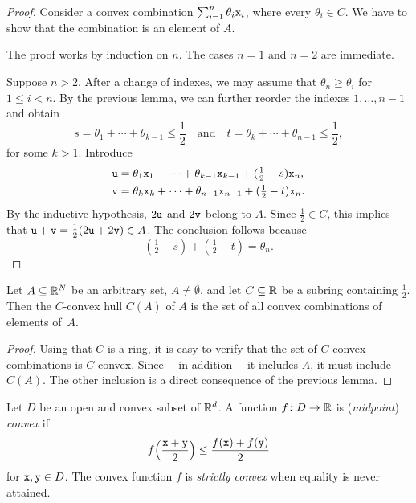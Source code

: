\begin{proof}
    Consider a convex combination $\sum_{i=1}^n\theta_i\mathtt x_i$, where every $\theta_i\in C$. We have to show that the combination is an element of $A$.

    The proof works by induction on $n$. The cases $n=1$ and $n=2$ are immediate.

    Suppose $n>2$. After a change of indexes, we may assume that $\theta_n\ge\theta_i$ for $1\le i<n$. By the previous lemma, we can further reorder the indexes $1,\dots,n-1$ and obtain
    \[
        s=\theta_1+\cdots+\theta_{k-1}\le\frac12
        \quad\text{and}\quad
        t=\theta_k+\cdots+\theta_{n-1}\le\frac12,
    \]
    for some $k>1$. Introduce
    \begin{align*}
        \mathtt u &= \theta_1\mathtt x_1+\cdots
            +\theta_{k-1}\mathtt x_{k-1}+(\tfrac12-s)\mathtt x_n,\\
        \mathtt v &= \theta_k\mathtt x_k+\cdots
            +\theta_{n-1}\mathtt x_{n-1}+(\tfrac12-t)\mathtt x_n.
    \end{align*}
    By the inductive hypothesis, $2\mathtt u$ and $2\mathtt v$ belong to $A$. Since $\frac12\in C$, this implies that $\mathtt u+\mathtt v=\frac12(2\mathtt u+2\mathtt v)\in A$. The conclusion follows because
    \[
        (\tfrac12-s)+(\tfrac12-t)=\theta_n.
    \]
\end{proof}

\begin{cor}
    Let\/ $A \subseteq \mathbb{R}^N$ be an arbitrary set, $A \ne \emptyset$, and let\/ $C \subseteq \mathbb{R}$ be a subring containing $\frac12$. Then the $C$-convex hull\/ $C(A)$ of\/ $A$ is the set of all convex combinations of elements of\/~$A$.
\end{cor}

\begin{proof}
    Using that $C$ is a ring, it is easy to verify that the set of $C$-convex combinations is $C$-convex. Since ---in addition--- it includes $A$, it must include~$C(A)$. The other inclusion is a direct consequence of the previous lemma.
    
\end{proof}

Let $D$ be an open and convex subset of $\mathbb{R}^d$. A function $f\colon D\to\mathbb{R}$ is (\textsl{midpoint}) \textsl{convex} if
$$
    f\Big(\frac{\mathtt x+\mathtt y}2\Big)
        \le \frac{f(\mathtt x)+f(\mathtt y)}2
$$
for $\mathtt x,\mathtt y\in D$. The convex function $f$ is \textsl{strictly convex} when equality is never attained.


